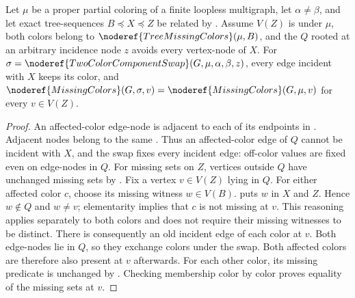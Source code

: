 \begin{lemma}
Let \(\mu\) be a proper partial coloring of a finite loopless
multigraph, let \(\alpha\ne\beta\), and let exact tree-sequences
\(B\preccurlyeq X\preccurlyeq Z\) be related by
. Assume \(V(Z)\) is
 under \(\mu\), both colors
belong to \(\noderef{TreeMissingColors}(\mu,B)\), and the
 \(Q\) rooted at an arbitrary incidence
node \(z\) avoids every vertex-node of \(X\).
For \(\sigma=\noderef{TwoColorComponentSwap}(G,\mu,\alpha,\beta,z)\),
every edge incident with \(X\) keeps its color, and
\(\noderef{MissingColors}(G,\sigma,v)=
\noderef{MissingColors}(G,\mu,v)\) for every \(v\in V(Z)\).
\end{lemma}
\begin{proof}
An affected-color edge-node is adjacent to each of its endpoints in
. Adjacent nodes belong to the same
. Thus an affected-color edge of \(Q\)
cannot be incident with \(X\), and the swap fixes every incident edge:
off-color values are fixed even on edge-nodes in \(Q\).
For missing sets on \(Z\), vertices outside \(Q\) have unchanged
missing sets by .
Fix a vertex \(v\in V(Z)\) lying in \(Q\). For either affected
color \(c\), choose its missing witness \(w\in V(B)\).
 puts \(w\)
in \(X\) and \(Z\). Hence \(w\notin Q\) and \(w\ne v\);
elementarity implies that \(c\) is not missing at \(v\).
This reasoning applies separately to both colors and does not require
their missing witnesses to be distinct.
There is consequently an old incident edge of each color at \(v\).
Both edge-nodes lie in \(Q\), so they exchange colors under the swap.
Both affected colors are therefore also present at \(v\) afterwards.
For each other color, its missing predicate is unchanged by
. Checking membership
color by color proves equality of the missing sets at \(v\).
\end{proof}
